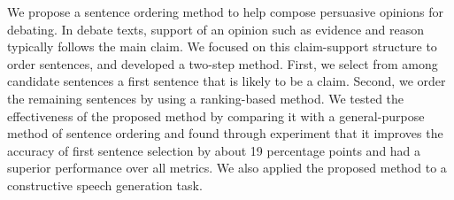 We propose a sentence ordering method to help compose persuasive opinions for debating. In debate texts, support of an opinion such as evidence and reason typically follows the main claim. We focused on this claim-support structure to order sentences, and developed a two-step method. First, we select from among candidate sentences a first sentence that is likely to be a claim. Second, we order the remaining sentences by using a ranking-based method. We tested the effectiveness of the proposed method by comparing it with a general-purpose method of sentence ordering and found through experiment that it improves the accuracy of first sentence selection by about 19 percentage points and had a superior performance over all metrics. We also applied the proposed method to a constructive speech generation task.
